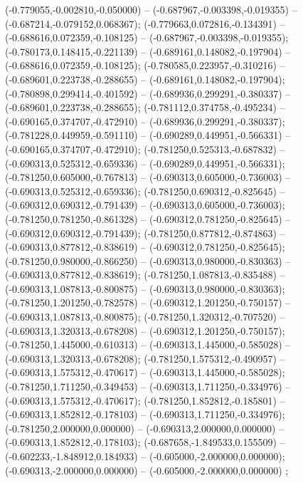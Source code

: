 (-0.779055,-0.002810,-0.050000) -- (-0.687967,-0.003398,-0.019355) -- (-0.687214,-0.079152,0.068367);
 (-0.779663,0.072816,-0.134391) -- (-0.688616,0.072359,-0.108125) -- (-0.687967,-0.003398,-0.019355);
 (-0.780173,0.148415,-0.221139) -- (-0.689161,0.148082,-0.197904) -- (-0.688616,0.072359,-0.108125);
 (-0.780585,0.223957,-0.310216) -- (-0.689601,0.223738,-0.288655) -- (-0.689161,0.148082,-0.197904);
 (-0.780898,0.299414,-0.401592) -- (-0.689936,0.299291,-0.380337) -- (-0.689601,0.223738,-0.288655);
 (-0.781112,0.374758,-0.495234) -- (-0.690165,0.374707,-0.472910) -- (-0.689936,0.299291,-0.380337);
 (-0.781228,0.449959,-0.591110) -- (-0.690289,0.449951,-0.566331) -- (-0.690165,0.374707,-0.472910);
 (-0.781250,0.525313,-0.687832) -- (-0.690313,0.525312,-0.659336) -- (-0.690289,0.449951,-0.566331);
 (-0.781250,0.605000,-0.767813) -- (-0.690313,0.605000,-0.736003) -- (-0.690313,0.525312,-0.659336);
 (-0.781250,0.690312,-0.825645) -- (-0.690312,0.690312,-0.791439) -- (-0.690313,0.605000,-0.736003);
 (-0.781250,0.781250,-0.861328) -- (-0.690312,0.781250,-0.825645) -- (-0.690312,0.690312,-0.791439);
 (-0.781250,0.877812,-0.874863) -- (-0.690313,0.877812,-0.838619) -- (-0.690312,0.781250,-0.825645);
 (-0.781250,0.980000,-0.866250) -- (-0.690313,0.980000,-0.830363) -- (-0.690313,0.877812,-0.838619);
 (-0.781250,1.087813,-0.835488) -- (-0.690313,1.087813,-0.800875) -- (-0.690313,0.980000,-0.830363);
 (-0.781250,1.201250,-0.782578) -- (-0.690312,1.201250,-0.750157) -- (-0.690313,1.087813,-0.800875);
 (-0.781250,1.320312,-0.707520) -- (-0.690313,1.320313,-0.678208) -- (-0.690312,1.201250,-0.750157);
 (-0.781250,1.445000,-0.610313) -- (-0.690313,1.445000,-0.585028) -- (-0.690313,1.320313,-0.678208);
 (-0.781250,1.575312,-0.490957) -- (-0.690313,1.575312,-0.470617) -- (-0.690313,1.445000,-0.585028);
 (-0.781250,1.711250,-0.349453) -- (-0.690313,1.711250,-0.334976) -- (-0.690313,1.575312,-0.470617);
 (-0.781250,1.852812,-0.185801) -- (-0.690313,1.852812,-0.178103) -- (-0.690313,1.711250,-0.334976);
 (-0.781250,2.000000,0.000000) -- (-0.690313,2.000000,0.000000) -- (-0.690313,1.852812,-0.178103);
 (-0.687658,-1.849533,0.155509) -- (-0.602233,-1.848912,0.184933) -- (-0.605000,-2.000000,0.000000);
 (-0.690313,-2.000000,0.000000) -- (-0.605000,-2.000000,0.000000) ;
